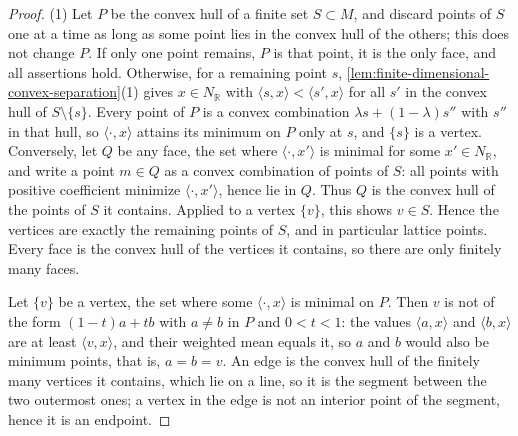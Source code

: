\begin{proof}
(1) Let $P$ be the convex hull of a finite set $S\subset M$, and discard points of $S$ one at a time as long as some point lies in the convex hull of the others; this does not change $P$. If only one point remains, $P$ is that point, it is the only face, and all assertions hold. Otherwise, for a remaining point $s$, \cref{lem:finite-dimensional-convex-separation}(1) gives $x\in N_{\mathbb R}$ with $\langle s,x\rangle<\langle s',x\rangle$ for all $s'$ in the convex hull of $S\setminus\{s\}$. Every point of $P$ is a convex combination $\lambda s+(1-\lambda)s''$ with $s''$ in that hull, so $\langle\cdot,x\rangle$ attains its minimum on $P$ only at $s$, and $\{s\}$ is a vertex. Conversely, let $Q$ be any face, the set where $\langle\cdot,x'\rangle$ is minimal for some $x'\in N_{\mathbb R}$, and write a point $m\in Q$ as a convex combination of points of $S$: all points with positive coefficient minimize $\langle\cdot,x'\rangle$, hence lie in $Q$. Thus $Q$ is the convex hull of the points of $S$ it contains. Applied to a vertex $\{v\}$, this shows $v\in S$. Hence the vertices are exactly the remaining points of $S$, and in particular lattice points. Every face is the convex hull of the vertices it contains, so there are only finitely many faces.

Let $\{v\}$ be a vertex, the set where some $\langle\cdot,x\rangle$ is minimal on $P$. Then $v$ is not of the form $(1-t)a+tb$ with $a\neq b$ in $P$ and $0<t<1$: the values $\langle a,x\rangle$ and $\langle b,x\rangle$ are at least $\langle v,x\rangle$, and their weighted mean equals it, so $a$ and $b$ would also be minimum points, that is, $a=b=v$. An edge is the convex hull of the finitely many vertices it contains, which lie on a line, so it is the segment between the two outermost ones; a vertex in the edge is not an interior point of the segment, hence it is an endpoint.


\end{proof}
